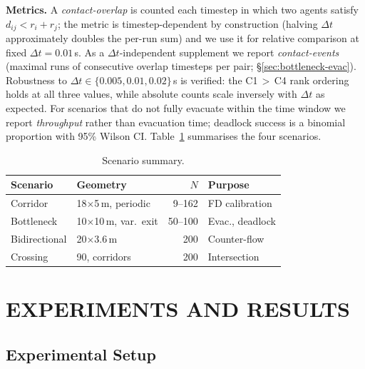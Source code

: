 \documentclass[a4paper,twoside]{article}
\begin{document}
\textbf{Metrics.}
A \emph{contact-overlap} is counted each timestep in which two agents satisfy $d_{ij}<r_i{+}r_j$; the metric is timestep-dependent by construction (halving $\Delta t$ approximately doubles the per-run sum) and we use it for relative comparison at fixed $\Delta t{=}0.01$\,s. As a $\Delta t$-independent supplement we report \emph{contact-events} (maximal runs of consecutive overlap timesteps per pair; \S\ref{sec:bottleneck-evac}). Robustness to $\Delta t\in\{0.005,0.01,0.02\}$\,s is verified: the C1\,$>$\,C4 rank ordering holds at all three values, while absolute counts scale inversely with $\Delta t$ as expected. For scenarios that do not fully evacuate within the time window we report \emph{throughput} rather than evacuation time; deadlock success is a binomial proportion with 95\% Wilson CI. Table~\ref{tab:scenarios} summarises the four scenarios.

\begin{table}[h]
\caption{Scenario summary.}\label{tab:scenarios}
\centering\scriptsize
\begin{tabular}{@{}llrl@{}}
\toprule
\textbf{Scenario} & \textbf{Geometry} & $N$ & \textbf{Purpose} \\
\midrule
Corridor & 18$\times$5\,m, periodic & 9--162 & FD calibration \\
Bottleneck & 10$\times$10\,m, var.\ exit & 50--100 & Evac., deadlock \\
Bidirectional & 20$\times$3.6\,m & 200 & Counter-flow \\
Crossing & 90\textdegree{}, corridors & 200 & Intersection \\
\bottomrule
\end{tabular}
\end{table}


\section{\uppercase{Experiments and Results}}
\label{sec:experiments}

\subsection{Experimental Setup}
\end{document}

